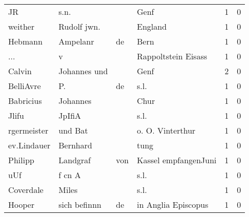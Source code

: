\begin{tabular}{llllrr}
                       JR &                               s.n. &             &                                        Genf &          1 &         0 \\
                  weither &                        Rudolf jwn. &             &                                     England &          1 &         0 \\
                  Hebmann &                           Ampelanr &          de &                                        Bern &          1 &         0 \\
                      ... &                                  v &             &                         Rappoltstein Eisass &          1 &         0 \\
                   Calvin &                       Johannes und &             &                                        Genf &          2 &         0 \\
                BelliAvre &                                 P. &          de &                                        s.l. &          1 &         0 \\
                Babricius &                           Johannes &             &                                        Chur &          1 &         0 \\
                    Jlifu &                             JpIfiA &             &                                        s.l. &          1 &         0 \\
              rgermeister &                            und Bat &             &                            o. O. Vinterthur &          1 &         0 \\
              ev.Lindauer &                           Bernhard &             &                                        tung &          1 &         0 \\
                  Philipp &                           Landgraf &         von &                        Kassel empfangenJuni &          1 &         0 \\
                      uUf &                             f cn A &             &                                        s.l. &          1 &         0 \\
                Coverdale &                              Miles &             &                                        s.l. &          1 &         0 \\
                   Hooper &                       sich befinnn &          de &                         in Anglia Episcopus &          1 &         0 \\

\end{tabular}
